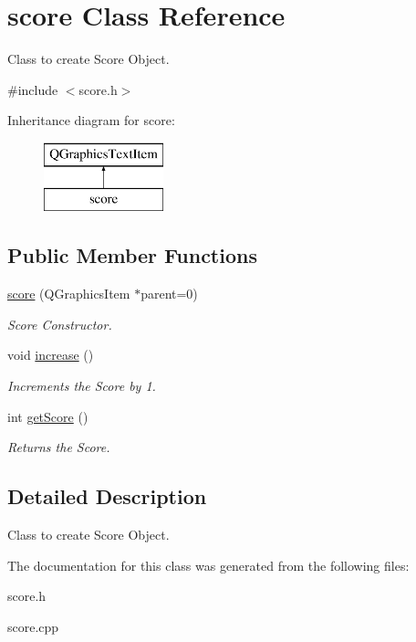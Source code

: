 \hypertarget{classscore}{}\section{score Class Reference}
\label{classscore}


Class to create Score Object.  




{\ttfamily \#include $<$score.\+h$>$}

Inheritance diagram for score\+:\begin{figure}[H]
\begin{center}
\leavevmode
\includegraphics[height=2.000000cm]{classscore}
\end{center}
\end{figure}
\subsection*{Public Member Functions}
\begin{DoxyCompactItemize}
\item 
\mbox{\label{classscore_aaf1ad193f5292e86d471d6bbd5d87cfb}} 
\hyperlink{classscore_aaf1ad193f5292e86d471d6bbd5d87cfb}{score} (Q\+Graphics\+Item $\ast$parent=0)
\begin{DoxyCompactList}\small\item\em Score Constructor. \end{DoxyCompactList}\item 
\mbox{\label{classscore_a0544bdc07cf845e67e978111b6166297}} 
void \hyperlink{classscore_a0544bdc07cf845e67e978111b6166297}{increase} ()
\begin{DoxyCompactList}\small\item\em Increments the Score by 1. \end{DoxyCompactList}\item 
\mbox{\label{classscore_a1556ae2741d225c184f5869ccf8082b8}} 
int \hyperlink{classscore_a1556ae2741d225c184f5869ccf8082b8}{get\+Score} ()
\begin{DoxyCompactList}\small\item\em Returns the Score. \end{DoxyCompactList}\end{DoxyCompactItemize}


\subsection{Detailed Description}
Class to create Score Object. 

The documentation for this class was generated from the following files\+:\begin{DoxyCompactItemize}
\item 
score.\+h\item 
score.\+cpp\end{DoxyCompactItemize}
